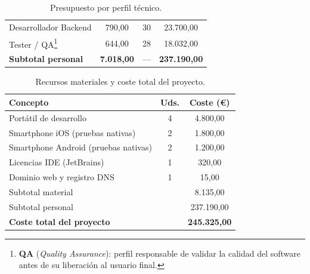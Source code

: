 \begin{table}[htbp]
\begin{tabular}{lccc}
        Desarrollador Backend                                                                                                                                          & 790,00              & 30                    & 23.700,00           \\
        Tester / QA\footnote{\textbf{QA} (\textit{Quality Assurance}): perfil responsable de validar la calidad del software antes de su liberación al usuario final.} & 644,00              & 28                    & 18.032,00           \\
        \midrule
        \textbf{Subtotal personal}                                                                                                                                     & \textbf{7.018,00}   & ---                   & \textbf{237.190,00} \\
        \bottomrule
    \end{tabular}
    \caption{Presupuesto por perfil técnico.}
    \label{tab:presupuesto_equipo}
\end{table}

\begin{table}[htbp]
    \centering
    \renewcommand{\arraystretch}{1.2}
    \begin{tabular}{lcc}
        \toprule
        \textbf{Concepto}                    & \textbf{Uds.} & \textbf{Coste (€)}  \\
        \midrule
        Portátil de desarrollo               & 4             & 4.800,00            \\
        Smartphone iOS (pruebas nativas)     & 2             & 1.800,00            \\
        Smartphone Android (pruebas nativas) & 2             & 1.200,00            \\
        Licencias IDE (JetBrains)            & 1             & 320,00              \\
        Dominio web y registro DNS           & 1             & 15,00               \\
        \midrule
        Subtotal material                    &               & 8.135,00            \\
        Subtotal personal                    &               & 237.190,00          \\
        \midrule
        \textbf{Coste total del proyecto}    &               & \textbf{245.325,00} \\
        \bottomrule
    \end{tabular}
    \caption{Recursos materiales y coste total del proyecto.}
    \label{tab:recursos_material}
\end{table}

